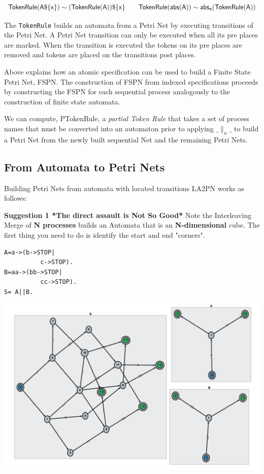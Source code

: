 \documentclass[]{article}
\begin{document}
{\[{\sf TokenRule({\sf A}\$\{x\}) \sim  (TokenRule({\sf A}))\$\{x\}  \qquad     TokenRule(abs({\sf A}))\sim  abs_n(TokenRule({\sf A})) }\]


The \verb|TokenRule|  builds an automata from a Petri Net by executing transitions of the Petri Net.  A Petri Net transition can only  be executed when all its pre places are marked. When the transition is executed the tokens on its pre places are removed and tokens are placed on the transitions post places.

Above explains how an atomic specification can be used to build a Finite State Petri Net, FSPN.  The construction of FSPN from indexed specifications  proceeds by constructing the FSPN for each sequential process analogously to the construction of finite state automata.

We can compute, {\sf PTokenRule},  a \emph{partial Token Rule} that takes a set of process names that must be converted into an automaton  prior to applying $\_\parallel_n\_$ to build a Petri Net from the newly built sequential Net and the remaining Petri Nets.


\subsection{From Automata to Petri Nets}
Building Petri Nets from automata with located transitions {\sf LA2PN} works as follows:

{\bf Suggestion 1 *The direct assault is Not So Good*}
Note the Interleaving Merge of {\bf N processes} builds  an Automata that is an {\bf N-dimensional} cube. The first thing you need to do is identify the start and end "corners".

\vspace{1em} \begin{minipage}{0.2\textwidth}
\begin{verbatim}
A=a->(b->STOP|
          c->STOP).
B=aa->(bb->STOP|
          cc->STOP).
S= A||B.
  \end{verbatim}
\end{minipage}
\begin{minipage}{0.6\textwidth}
\begin{center}\includegraphics[scale=0.4]{Surface.png}\end{center}
\end{minipage}

}
\end{document}
